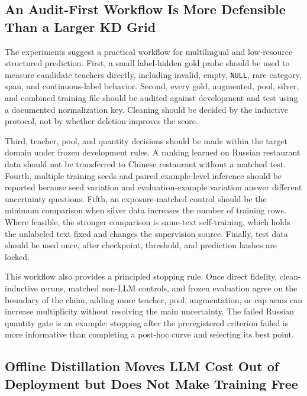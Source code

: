 \subsection{An Audit-First Workflow Is More Defensible Than a Larger KD
Grid}\label{an-audit-first-workflow-is-more-defensible-than-a-larger-kd-grid}

The experiments suggest a practical workflow for multilingual and
low-resource structured prediction. First, a small label-hidden gold
probe should be used to measure candidate teachers directly, including
invalid, empty, \texttt{NULL}, rare category, span, and continuous-label
behavior. Second, every gold, augmented, pool, silver, and combined
training file should be audited against development and test using a
documented normalization key. Cleaning should be decided by the
inductive protocol, not by whether deletion improves the score.

Third, teacher, pool, and quantity decisions should be made within the
target domain under frozen development rules. A ranking learned on
Russian restaurant data should not be transferred to Chinese restaurant
without a matched test. Fourth, multiple training seeds and paired
example-level inference should be reported because seed variation and
evaluation-example variation answer different uncertainty questions.
Fifth, an exposure-matched control should be the minimum comparison when
silver data increases the number of training rows. Where feasible, the
stronger comparison is same-text self-training, which holds the
unlabeled text fixed and changes the supervision source. Finally, test
data should be used once, after checkpoint, threshold, and prediction
hashes are locked.

This workflow also provides a principled stopping rule. Once direct
fidelity, clean-inductive reruns, matched non-LLM controls, and frozen
evaluation agree on the boundary of the claim, adding more teacher,
pool, augmentation, or cap arms can increase multiplicity without
resolving the main uncertainty. The failed Russian quantity gate is an
example: stopping after the preregistered criterion failed is more
informative than completing a post-hoc curve and selecting its best
point.

\subsection{Offline Distillation Moves LLM Cost Out of Deployment but
Does Not Make Training
Free}\label{offline-distillation-moves-llm-cost-out-of-deployment-but-does-not-make-training-free}

